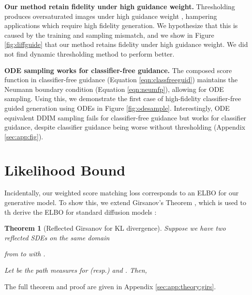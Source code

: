 \documentclass{article}
\theoremstyle{plain}
\newtheorem{theorem}{Theorem}[section]
\theoremstyle{definition}
\theoremstyle{remark}
\begin{document}
\textbf{Our method retain fidelity under high guidance weight.} Thresholding produces oversaturated images under high guidance weight  \citep{Ho2022ClassifierFreeDG, Saharia2022PhotorealisticTD}, hampering applications which require high fidelity generation. We hypothesize that this is caused by the training and sampling mismatch, and we show in Figure \ref{fig:diffguide} that our method retains fidelity under high guidance weight. We did not find dynamic thresholding method to perform better.

\textbf{ODE sampling works for classifier-free guidance.} The composed score function in classifier-free guidance (Equation \ref{eqn:classfreeguid}) maintains the Neumann boundary condition (Equation \ref{eqn:neumfp}), allowing for ODE sampling. Using this, we demonstrate the first case of high-fidelity classifier-free guided generation using ODEs in Figure \ref{fig:odesample}. Interestingly, ODE equivalent DDIM sampling fails for classifier-free guidance but works for classifier guidance, despite classifier guidance being worse without thresholding (Appendix \ref{sec:app:fig}).




 \section{Likelihood Bound}\label{sec:likelihood}

Incidentally, our weighted score matching loss corresponds to an ELBO for our generative model. To show this, we extend Girsanov's Theorem \citep{ksendal1987StochasticDE}, which is used to th derive the ELBO for standard diffusion models \citep{Song2021MaximumLT,Kingma2021VariationalDM,Huang2021AVP}:
\begin{theorem}[Reflected Girsanov for KL divergence]\label{thm:reflgirsanov}
    Suppose we have two reflected SDEs on the same domain 
    
    from  to  with . 
    
    Let  be the path measures for (resp.)  and . Then,
    
\end{theorem}
The full theorem and proof are given in Appendix \ref{sec:app:theory:girs}.
\end{document}
